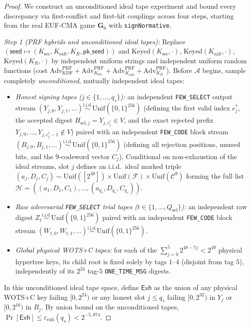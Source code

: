 \documentclass[11pt,a4paper]{article}
\theoremstyle{definition}
\theoremstyle{remark}
\newcommand{\WOTSC}{\textsf{WOTS+C}}
\newcommand{\Keyed}{\mathrm{Keyed}}
\newcommand{\Adv}{\mathrm{Adv}}
\newcommand{\bits}{\{0,1\}}
\newcommand{\Unif}{\mathrm{Unif}}
\newcommand{\calF}{\mathcal{F}}
\newcommand{\calC}{\mathcal{C}}
\begin{document}
\begin{proof}
We construct an unconditioned ideal tape experiment and bound every discrepancy via first-conflict and first-hit couplings across four steps, starting from the real EUF-CMA game $\mathbf{G}_0$ with \texttt{signNormative}.

\emph{Step 1 (PRF hybrids and unconditioned ideal tapes):}
Replace $(\mathsf{seed} \mapsto (K_{\mathrm{sec}}, K_{\mathrm{salt}}, K_R, \mathsf{pk\_seed}))$ and $\Keyed(K_{\mathrm{sec}}, \cdot)$, $\Keyed(K_{\mathrm{salt}}, \cdot)$, $\Keyed(K_R, \cdot)$ by independent uniform strings and independent uniform random functions (cost $\Adv^{\mathrm{PRF}}_{\mathrm{KDF}} + \Adv^{\mathrm{PRF}}_{K_{\mathrm{sec}}} + \Adv^{\mathrm{PRF}}_{K_{\mathrm{salt}}} + \Adv^{\mathrm{PRF}}_{K_R}$). Before $\mathcal{A}$ begins, sample completely \emph{unconditioned}, mutually independent ideal tapes:
\begin{itemize}[leftmargin=1.4em,itemsep=1pt]
  \item \emph{Honest signing tapes ($j \in \{1,\dots,q_s\}$):} an independent \texttt{FEW\_SELECT} output stream $(Y_{j, 0}, Y_{j, 1}, \dots) \stackrel{\text{i.i.d.}}{\sim} \Unif(\bits^{256})$ (defining the first valid index $c_j^*$, the accepted digest $H_{\mathrm{sel}, j} = Y_{j, c_j^*} \in V$, and the exact rejected prefix $Y_{j,0}, \dots, Y_{j, c_j^* - 1} \notin V$) paired with an independent \texttt{FEW\_CODE} block stream $(B_{j, 0}, B_{j, 1}, \dots) \stackrel{\text{i.i.d.}}{\sim} \Unif(\bits^{256})$ (defining all rejection positions, unused bits, and the $9$-codeword vector $C_j$). Conditional on non-exhaustion of the ideal streams, slot $j$ defines an i.i.d.\ ideal marked triple $(a_j, D_j, C_j) \sim \Unif([2^{48}]) \times \Unif(\calF) \times \Unif(\calC^9)$ forming the full list $\mathcal{H} = ((a_1, D_1, C_1), \dots, (a_{q_s}, D_{q_s}, C_{q_s}))$.
  \item \emph{Raw adversarial \texttt{FEW\_SELECT} trial tapes ($t \in \{1,\dots,Q_{\mathrm{sel}}\}$):} an independent raw digest $Z_t \stackrel{\text{i.i.d.}}{\sim} \Unif(\bits^{256})$ paired with an independent \texttt{FEW\_CODE} block stream $(W_{t, 0}, W_{t, 1}, \dots) \stackrel{\text{i.i.d.}}{\sim} \Unif(\bits^{256})$.
  \item \emph{Global physical \WOTSC{} tapes:} for each of the $\sum_{j=0}^{5} 2^{48 - 7j} < 2^{49}$ physical hypertree keys, its child root is fixed solely by tags $1$--$4$ (disjoint from tag $5$), independently of its $2^{24}$ tag-$5$ \texttt{ONE\_TIME\_MSG} digests.
\end{itemize}
In this unconditioned ideal tape space, define $\mathsf{Exh}$ as the union of any physical \WOTSC{} key failing $[0, 2^{24})$ or any honest slot $j \le q_s$ failing $[0, 2^{32})$ in $Y_j$ or $[0, 2^{16})$ in $B_j$. By union bound on the unconditioned tapes, $\Pr[\mathsf{Exh}] \le \varepsilon_{\mathrm{exh}}(q_s) < 2^{-5{,}874}$.


\end{proof}
\end{document}
